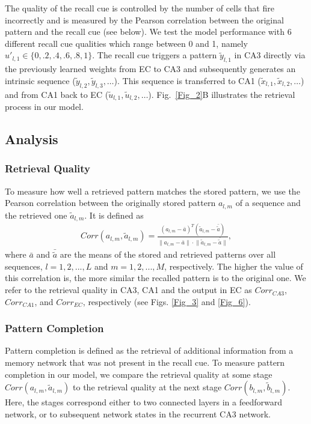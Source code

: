 \documentclass[utf8]{frontiersSCNS} %
\begin{document}
The quality of the recall cue is controlled by the number of cells that fire incorrectly and is measured by the Pearson correlation between the original pattern and the recall cue (see below). We test the model performance with $6$ different recall cue qualities which range between 0 and 1, namely $ u'_{l, 1} \in \{ 0, .2, .4, .6, .8, 1 \} $.       
%
The recall cue triggers a pattern $\tilde{y}_{l, 1}$ in CA3 directly via the previously learned weights from EC to CA3 and subsequently generates an intrinsic sequence ($\tilde{y}_{l, 2}, \tilde{y}_{l, 3}, \ldots$). This sequence is transferred to CA1 ($\tilde{x}_{l, 1}, \tilde{x}_{l, 2}, \ldots$) and from CA1 back to EC ($\tilde{u}_{l, 1}, \tilde{u}_{l, 2}, \ldots$). Fig.~\ref{Fig_2}B illustrates the retrieval process in our model. 


\subsection{Analysis}

\subsubsection{Retrieval Quality}
To measure how well a retrieved pattern matches the stored pattern, we use the Pearson correlation between the originally stored pattern $a_{l, m}$ of a sequence  and the retrieved one $\tilde{a}_{l, m}$. It is defined as
\begin{align*}
	Corr(a_{l, m},\tilde{a}_{l, m})  = \frac{(a_{l, m} -\bar{a})^T(\tilde{a}_{l, m} -\bar{\tilde{a}})}
{\lVert{a_{l, m} -\bar{a}} \rVert \cdot \lVert{\tilde{a}_{l, m} -\bar{\tilde{a}}}\rVert },
\end{align*}     
where $\bar{a}$ and $\bar{\tilde{a}}$ are the means of the stored and retrieved patterns over all sequences, $l = 1,2, ..., L$ and $m = 1,2, ..., M$, respectively. The higher the value of this correlation is, the more similar the recalled pattern is to the original one. We refer to the retrieval quality in CA3, CA1 and the output in EC as $Corr_{CA3}$, $Corr_{CA1}$, and $Corr_{EC}$, respectively (see Figs. \ref{Fig_3} and \ref{Fig_6}).

\subsubsection{Pattern Completion}
Pattern completion is defined as the retrieval of additional information from a memory network that was not present in the recall cue. To measure pattern completion in our model, we compare the retrieval quality at some stage $Corr(a_{l, m},\tilde{a}_{l, m})$ to the retrieval quality at the next stage $Corr(b_{l, m},\tilde{b}_{l, m})$. Here, the stages correspond either to two connected layers in a feedforward network, or to subsequent network states in the recurrent CA3 network. 
\end{document}
